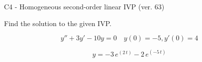 \begin{exercise}
  \begin{exerciseTitle}C4 - Homogeneous second-order linear IVP (ver. 63)\end{exerciseTitle}
  \begin{exerciseStatement}
    
Find the solution to the given IVP.

    
\[y''+3y'-10y = 0 \hspace{1em} y(0) = -5 , y'(0) = 4\]

  \end{exerciseStatement}
  \begin{exerciseAnswer}
    
\[y= -3 \, e^{\left(2 \, t\right)} - 2 \, e^{\left(-5 \, t\right)}\]

  \end{exerciseAnswer}
\end{exercise}